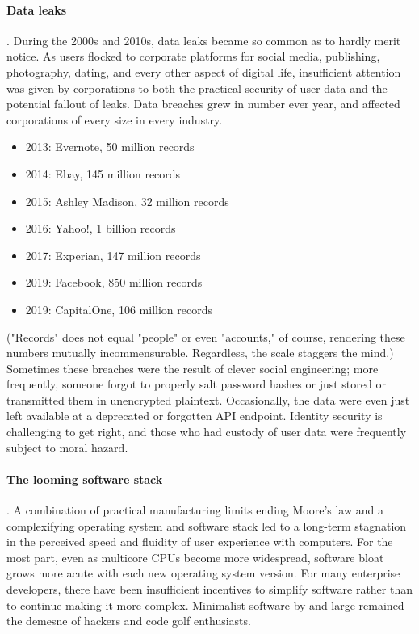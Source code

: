 \paragraph{Data leaks}.  During the 2000s and 2010s, data leaks became so common as to hardly merit notice.  As users flocked to corporate platforms for social media, publishing, photography, dating, and every other aspect of digital life, insufficient attention was given by corporations to both the practical security of user data and the potential fallout of leaks.  Data breaches grew in number ever year, and affected corporations of every size in every industry.

\begin{itemize}
  \item  2013:  Evernote, 50 million records
  \item  2014:  Ebay, 145 million records
  \item  2015:  Ashley Madison, 32 million records
  \item  2016:  Yahoo!, 1 billion records
  \item  2017:  Experian, 147 million records
  \item  2019:  Facebook, 850 million records
  \item  2019:  CapitalOne, 106 million records
\end{itemize}

("Records" does not equal "people" or even "accounts," of course, rendering these numbers mutually incommensurable.  Regardless, the scale staggers the mind.)  Sometimes these breaches were the result of clever social engineering; more frequently, someone forgot to properly salt password hashes or just stored or transmitted them in unencrypted plaintext.  Occasionally, the data were even just left available at a deprecated or forgotten API endpoint.  Identity security is challenging to get right, and those who had custody of user data were frequently subject to moral hazard.

\paragraph{The looming software stack}.  A combination of practical manufacturing limits ending Moore's law and a complexifying operating system and software stack led to a long-term stagnation in the perceived speed and fluidity of user experience with computers.  For the most part, even as multicore CPUs become more widespread, software bloat grows more acute with each new operating system version.  For many enterprise developers, there have been insufficient incentives to simplify software rather than to continue making it more complex.  Minimalist software by and large remained the demesne of hackers and code golf enthusiasts.

